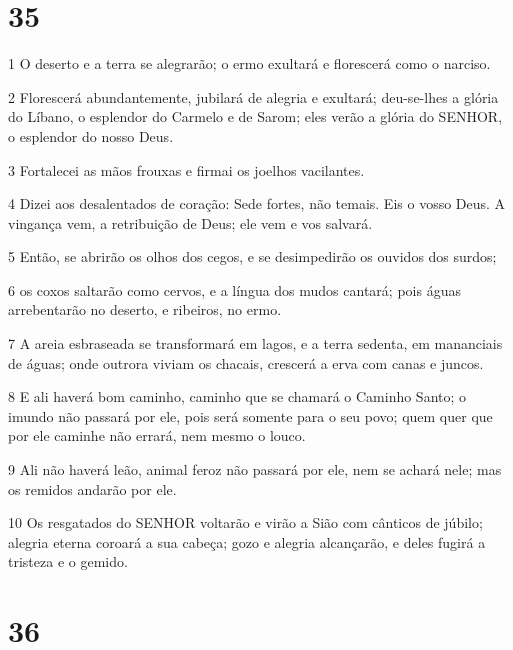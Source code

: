 \chapter{35}

\par 1 O deserto e a terra se alegrarão; o ermo exultará e florescerá como o narciso.
\par 2 Florescerá abundantemente, jubilará de alegria e exultará; deu-se-lhes a glória do Líbano, o esplendor do Carmelo e de Sarom; eles verão a glória do SENHOR, o esplendor do nosso Deus.
\par 3 Fortalecei as mãos frouxas e firmai os joelhos vacilantes.
\par 4 Dizei aos desalentados de coração: Sede fortes, não temais. Eis o vosso Deus. A vingança vem, a retribuição de Deus; ele vem e vos salvará.
\par 5 Então, se abrirão os olhos dos cegos, e se desimpedirão os ouvidos dos surdos;
\par 6 os coxos saltarão como cervos, e a língua dos mudos cantará; pois águas arrebentarão no deserto, e ribeiros, no ermo.
\par 7 A areia esbraseada se transformará em lagos, e a terra sedenta, em mananciais de águas; onde outrora viviam os chacais, crescerá a erva com canas e juncos.
\par 8 E ali haverá bom caminho, caminho que se chamará o Caminho Santo; o imundo não passará por ele, pois será somente para o seu povo; quem quer que por ele caminhe não errará, nem mesmo o louco.
\par 9 Ali não haverá leão, animal feroz não passará por ele, nem se achará nele; mas os remidos andarão por ele.
\par 10 Os resgatados do SENHOR voltarão e virão a Sião com cânticos de júbilo; alegria eterna coroará a sua cabeça; gozo e alegria alcançarão, e deles fugirá a tristeza e o gemido.

\chapter{36}

